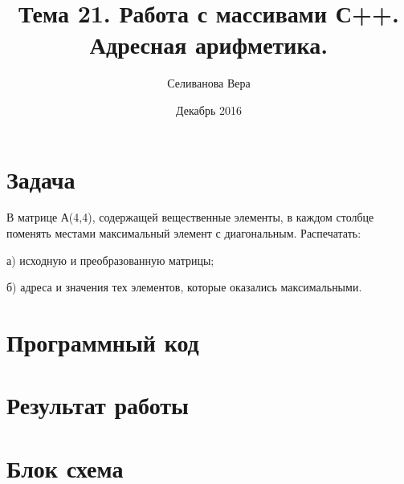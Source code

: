 \documentclass{article}
\title{Тема 21. Работа с массивами С++. Адресная арифметика.}
\author{Селиванова Вера}
\date{Декабрь 2016}
\begin{document}
\maketitle

\pagebreak



\section{Задача}

В матрице А(4,4), содержащей вещественные элементы, в каждом столбце поменять местами максимальный элемент с диагональным. Распечатать:

а) исходную и преобразованную матрицы;

б) адреса и значения тех элементов, которые оказались максимальными.

\pagebreak



\section{Программный код}



\pagebreak



\section{Результат работы}



\pagebreak



\section{Блок схема}
\end{document}
